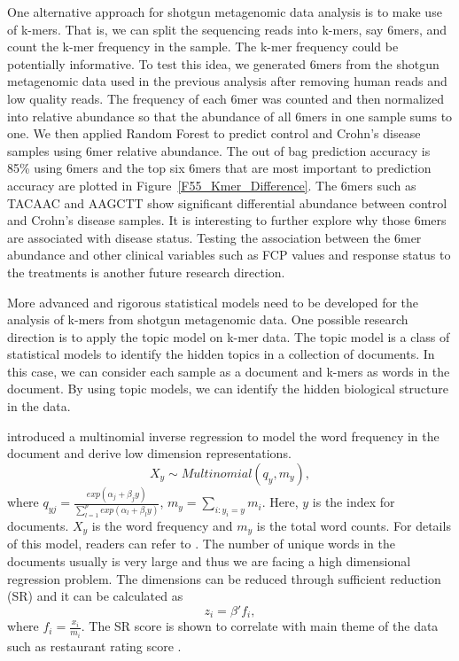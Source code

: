 One alternative approach for shotgun metagenomic data analysis is to make use of k-mers. That is, we can split the sequencing reads into k-mers, say 6mers, and count the k-mer frequency in the sample. The k-mer frequency could be potentially informative. To test this idea, we generated 6mers from the shotgun metagenomic data used in the previous analysis after removing human reads and low quality reads.  The  frequency of each 6mer was counted and then normalized into relative abundance so that the abundance of all 6mers in one sample sums to one. We then applied Random Forest to predict control and Crohn's disease samples using 6mer relative abundance. The out of bag prediction accuracy is 85\% using 6mers and the top six 6mers that are most important to prediction accuracy are plotted in Figure~\ref{F55_Kmer_Difference}. The 6mers such as TACAAC and AAGCTT show significant differential abundance between control and Crohn's disease samples. It is interesting to further explore why those 6mers are associated with disease status. Testing the association between the 6mer abundance and other clinical variables such as FCP values and response status to the treatments is another future research direction. 

More advanced and rigorous statistical models need to be developed for the analysis of k-mers from shotgun metagenomic data. One possible research direction is to apply the topic model on k-mer data. The topic model is a class of statistical models to identify the hidden topics in a collection of documents. In this case, we can consider each sample as a document and k-mers as words in the document. By using topic models, we can identify the hidden biological structure in the data. 

\citet{taddy2013multinomial} introduced a multinomial inverse regression to model the word frequency in the document and derive low dimension representations.
\begin{equation*}
X_y \sim Multinomial(q_y,m_y),
\end{equation*}
where $q_{yj} = \frac{exp(\alpha_j+\beta_jy)}{\sum_{l=1}^{p}exp(\alpha_l+\beta_ly)}$,
$m_y = \sum_{i:y_i=y}m_i$.
Here, $y$ is the index for documents. $X_y$ is the word frequency and $m_y$ is the total word counts. For details of this model, readers can refer to \citet{taddy2013multinomial}.
The number of unique words in the documents usually is very large and thus we are facing a high dimensional regression problem. The dimensions  can be reduced through sufficient reduction (SR) and it can be calculated as 
\begin{equation*}
z_i = \beta'f_i,
\end{equation*}
where $f_i = \frac{x_i}{m_i}$.
The SR score is shown to correlate with main theme of the data such as restaurant rating score \citep{taddy2013multinomial}. 


